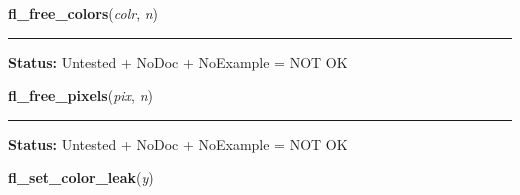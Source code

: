     \vspace{0.5ex}

\hspace{.8\funcindent}\begin{boxedminipage}{\funcwidth}

    \raggedright \textbf{fl\_free\_colors}(\textit{colr}, \textit{n})

    \vspace{-1.5ex}

    \rule{\textwidth}{0.5\fboxrule}
\setlength{\parskip}{2ex}
\setlength{\parskip}{1ex}
\textbf{Status:} Untested + NoDoc + NoExample = NOT OK



    \end{boxedminipage}

    \label{xformslib:library:fl_free_pixels}

    \vspace{0.5ex}

\hspace{.8\funcindent}\begin{boxedminipage}{\funcwidth}

    \raggedright \textbf{fl\_free\_pixels}(\textit{pix}, \textit{n})

    \vspace{-1.5ex}

    \rule{\textwidth}{0.5\fboxrule}
\setlength{\parskip}{2ex}
\setlength{\parskip}{1ex}
\textbf{Status:} Untested + NoDoc + NoExample = NOT OK



    \end{boxedminipage}

    \label{xformslib:library:fl_set_color_leak}

    \vspace{0.5ex}

\hspace{.8\funcindent}\begin{boxedminipage}{\funcwidth}

    \raggedright \textbf{fl\_set\_color\_leak}(\textit{y})

\setlength{\parskip}{2ex}
\setlength{\parskip}{1ex}
    \end{boxedminipage}

